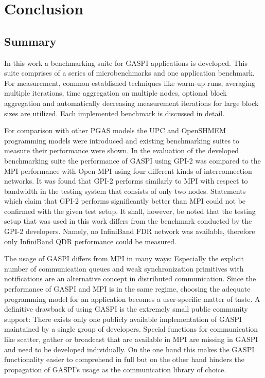 \chapter{Conclusion}

\section{Summary}

In this work a benchmarking suite for \ac{GASPI} applications is developed. This suite comprises of a series of microbenchmarks and one application benchmark. For measurement, common established techniques like warm-up runs, averaging multiple iterations, time aggregation on multiple nodes, optional block aggregation and automatically decreasing measurement iterations for large block sizes are utilized. Each implemented benchmark is discussed in detail.

For comparison with other \ac{PGAS} models the \ac{UPC} and \ac{OpenSHMEM} programming models were introduced and existing benchmarking suites to measure their performance were shown. In the evaluation of the developed benchmarking suite the performance of \ac{GASPI} using \ac{GPI}-2 was compared to the \ac{MPI} performance with Open MPI using four different kinds of interconnection networks. It was found that \ac{GPI}-2 performs similarly to \ac{MPI} with respect to bandwidth in the testing system that consists of only two nodes. Statements which claim that \ac{GPI}-2 performs significantly better than \ac{MPI} could not be confirmed with the given test setup. It shall, however, be noted that the testing setup that was used in this work differs from the benchmark conducted by the \ac{GPI}-2 developers. Namely, no InfiniBand FDR network was available, therefore only InfiniBand QDR performance could be measured.

The usage of \ac{GASPI} differs from \ac{MPI} in many ways: Especially the explicit number of communication queues and weak synchronization primitives with notifications are an alternative concept in distributed communication. Since the performance of \ac{GASPI} and \ac{MPI} is in the same regime, choosing the adequate programming model for an application becomes a user-specific matter of taste. A definitive drawback of using \ac{GASPI} is the extremely small public community support: There exists only one publicly available implementation of \ac{GASPI} maintained by a single group of developers. Special functions for communication like scatter, gather or broadcast that are available in \ac{MPI} are missing in \ac{GASPI} and need to be developed individually. On the one hand this makes the \ac{GASPI} functionality easier to comprehend in full but on the other hand hinders the propagation of \ac{GASPI}'s usage as the communication library of choice.

